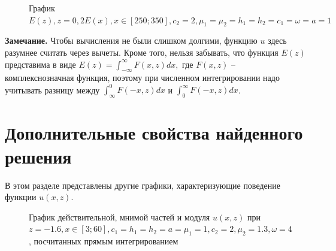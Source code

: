 \documentclass[a4paper, 12pt]{article}
\begin{document}
\begin{figure}[h!]
    \noindent{}
    \caption{График $E(z), z=0, 2E(x), x \in [250;350], c_2=2, \mu_1=\mu_2=h_1=h_2=c_1=\omega=a=1$}
    \label{figCurves}
    \end{figure}   
    
    {\bf Замечание.} Чтобы вычисления не были слишком долгими, функцию $u$ здесь разумнее считать через вычеты.
    Кроме того, нельзя забывать, что функция $E(z)$ представима в виде $E(z)=\int^{\infty}_{-\infty} F(x,z) dx,$ где $F(x,z)$ -- комплекснозначная функция, поэтому при численном интегрировании надо учитывать разницу между $\int^{0}_{\infty} F(-x,z) dx$ и $\int^{\infty}_0 F(-x,z) dx$.

\section{Дополнительные свойства найденного решения}
В этом разделе представлены другие графики, характеризующие поведение функции $u(x,z)$.

\begin{figure}[h!]
\noindent{}
\caption{График действительной, мнимой частей и модуля $u(x,z)$ при $z=-1.6, x \in [3;60], c_1=h_1=h_2=a=\mu_1=1, c_2=2,\mu_2=1.3,\omega=4$, посчитанных прямым интегрированием}
\label{figCurves}
\end{figure}
\end{document}
